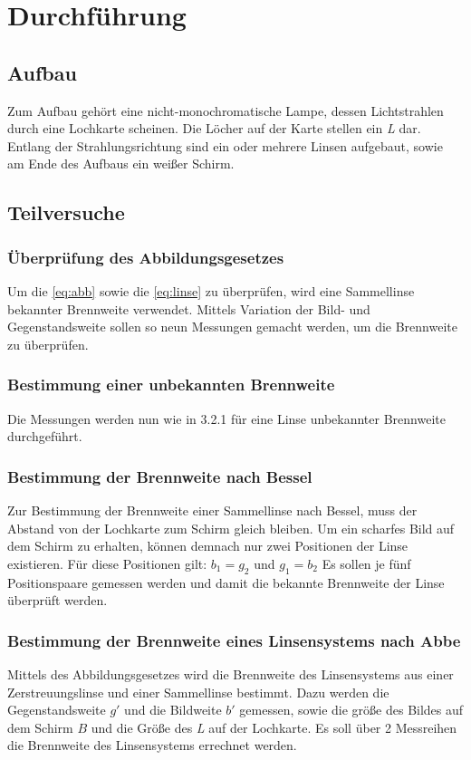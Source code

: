 \section{Durchführung}
\label{sec:Durchführung}

\subsection{Aufbau}
Zum Aufbau gehört eine nicht-monochromatische Lampe, dessen Lichtstrahlen durch eine Lochkarte scheinen.
Die Löcher auf der Karte stellen ein \textit{L} dar.\\
Entlang der Strahlungsrichtung sind ein oder mehrere Linsen aufgebaut, sowie am Ende des Aufbaus ein weißer Schirm.

\subsection{Teilversuche}
\subsubsection{Überprüfung des Abbildungsgesetzes}
Um die \autoref{eq:abb} sowie die \autoref{eq:linse} zu überprüfen, wird eine Sammellinse bekannter Brennweite verwendet.
Mittels Variation der Bild- und Gegenstandsweite sollen so neun Messungen gemacht werden, um die Brennweite zu überprüfen.

\subsubsection{Bestimmung einer unbekannten Brennweite}
Die Messungen werden nun wie in 3.2.1 für eine Linse unbekannter Brennweite durchgeführt.

\subsubsection{Bestimmung der Brennweite nach Bessel}
Zur Bestimmung der Brennweite einer Sammellinse nach Bessel, muss der Abstand von der Lochkarte zum Schirm gleich bleiben.
Um ein scharfes Bild auf dem Schirm zu erhalten, können demnach nur zwei Positionen der Linse existieren.
Für diese Positionen gilt: $b_1=g_2$ und $g_1=b_2$
Es sollen je fünf Positionspaare gemessen werden und damit die bekannte Brennweite der Linse überprüft werden.

\subsubsection{Bestimmung der Brennweite eines Linsensystems nach Abbe}
Mittels des Abbildungsgesetzes wird die Brennweite des Linsensystems aus einer Zerstreuungslinse und einer Sammellinse bestimmt.
Dazu werden die Gegenstandsweite $g'$ und die Bildweite $b'$ gemessen, sowie die größe des Bildes auf dem Schirm $B$ und die Größe des \textit{L} auf der Lochkarte.
Es soll über 2 Messreihen die Brennweite des Linsensystems errechnet werden.